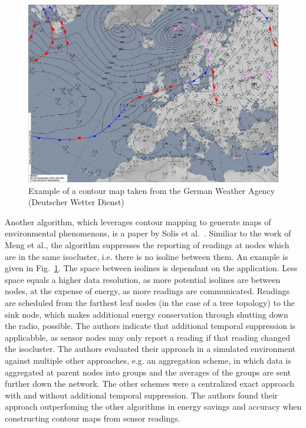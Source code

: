 \begin{figure}[h]
\includegraphics[width=\linewidth]{images/contour-map.jpg}
\caption{Example of a contour map taken from the German Weather Agency (Deutscher Wetter Dienst)~\cite{dwd}}
\label{fig:contour map}
\centering
\end{figure}

Another algorithm, which leverages contour mapping to generate maps of
environmental phenomenons, is a paper by Solis et
al.~\cite{solis2005efficient}. Similiar to the work of Meng et al., the
algorithm suppresses the reporting of readings at nodes which are in the same
isocluster, i.e. there is no isoline between them. An example is given in
Fig.~\ref{fig:contour map}. The space between isolines is dependant on the
application. Less space equals a higher data resolution, as more potential
isolines are between nodes, at the expense of energy, as more readings are
communicated. Readings are scheduled from the farthest leaf nodes (in the case
of a tree topology) to the sink node, which makes additional energy
conservation through shutting down the radio, possible. The authors indicate
that additional temporal suppression is applicabble, as sensor nodes may only
report a reading if that reading changed the isocluster. The authors evaluated
their approach in a simulated environment against multiple other approaches,
e.g. an aggregation scheme, in which data is aggregated at parent nodes into
groups and the averages of the groups are sent further down the network. The
other schemes were a centralized exact approach with and without additional
temporal suppression. The authors found their approach outperfoming the other
algorithms in energy savings and accuracy when constructing contour maps from
sensor readings.

